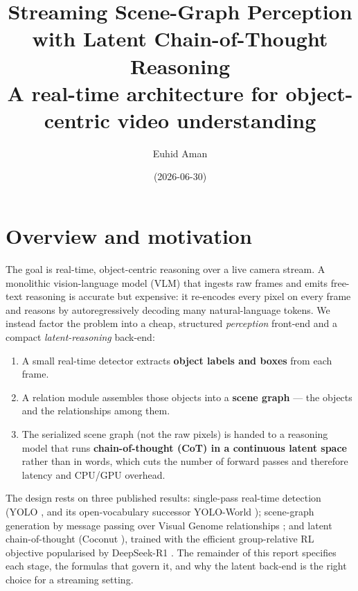 \documentclass[10pt,letterpaper]{article}
\title{\textbf{Streaming Scene-Graph Perception with Latent Chain-of-Thought Reasoning}\\[0.2cm]
\large A real-time architecture for object-centric video understanding}
\author{Euhid Aman}
\date{(2026-06-30)}
\begin{document}
\maketitle

\section{Overview and motivation}

The goal is real-time, object-centric reasoning over a live camera stream. A monolithic
vision-language model (VLM) that ingests raw frames and emits free-text reasoning is accurate but
expensive: it re-encodes every pixel on every frame and reasons by autoregressively decoding many
natural-language tokens. We instead factor the problem into a cheap, structured \emph{perception}
front-end and a compact \emph{latent-reasoning} back-end:

\begin{enumerate}
  \item A small real-time detector extracts \textbf{object labels and boxes} from each frame.
  \item A relation module assembles those objects into a \textbf{scene graph} --- the objects and
        the relationships among them.
  \item The serialized scene graph (not the raw pixels) is handed to a reasoning model that runs
        \textbf{chain-of-thought (CoT) in a continuous latent space} rather than in words, which
        cuts the number of forward passes and therefore latency and CPU/GPU overhead.
\end{enumerate}

The design rests on three published results: single-pass real-time detection (YOLO
\cite{redmon2016}, and its open-vocabulary successor YOLO-World \cite{cheng2024}); scene-graph
generation by message passing \cite{xu2017} over Visual Genome relationships \cite{krishna2017};
and latent chain-of-thought (Coconut \cite{hao2024}), trained with the efficient
group-relative RL objective popularised by DeepSeek-R1 \cite{deepseek2025}. The remainder of this
report specifies each stage, the formulas that govern it, and why the latent back-end is the right
choice for a streaming setting.
\end{document}
